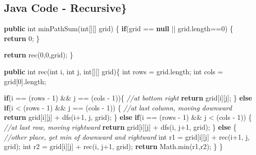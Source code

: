 \documentclass[]{book}
\newenvironment{Shaded}{\begin{snugshade}}{\end{snugshade}}
\newcommand{\BuiltInTok}[1]{#1}
\newcommand{\CommentTok}[1]{\textcolor[rgb]{0.56,0.35,0.01}{\textit{#1}}}
\newcommand{\DataTypeTok}[1]{\textcolor[rgb]{0.13,0.29,0.53}{#1}}
\newcommand{\DecValTok}[1]{\textcolor[rgb]{0.00,0.00,0.81}{#1}}
\newcommand{\FunctionTok}[1]{\textcolor[rgb]{0.00,0.00,0.00}{#1}}
\newcommand{\KeywordTok}[1]{\textcolor[rgb]{0.13,0.29,0.53}{\textbf{#1}}}
\newcommand{\NormalTok}[1]{#1}
\begin{document}
\hypertarget{java-code---recursive}{%
\subsection{Java Code - Recursive\}}\label{java-code---recursive}}

\begin{Shaded}
\begin{Highlighting}[]
\KeywordTok{public} \DataTypeTok{int} \FunctionTok{minPathSum}\NormalTok{(}\DataTypeTok{int}\NormalTok{[][] grid) \{}
    \KeywordTok{if}\NormalTok{(grid == }\KeywordTok{null}\NormalTok{ || grid.}\FunctionTok{length}\NormalTok{==}\DecValTok{0}\NormalTok{) \{}
        \KeywordTok{return} \DecValTok{0}\NormalTok{;}
\NormalTok{    \}}

    \KeywordTok{return} \FunctionTok{rec}\NormalTok{(}\DecValTok{0}\NormalTok{,}\DecValTok{0}\NormalTok{,grid);}
\NormalTok{\}}

\KeywordTok{public} \DataTypeTok{int} \FunctionTok{rec}\NormalTok{(}\DataTypeTok{int}\NormalTok{ i, }\DataTypeTok{int}\NormalTok{ j, }\DataTypeTok{int}\NormalTok{[][] grid)\{}
    \DataTypeTok{int}\NormalTok{ rows = grid.}\FunctionTok{length}\NormalTok{;}
    \DataTypeTok{int}\NormalTok{ cols = grid[}\DecValTok{0}\NormalTok{].}\FunctionTok{length}\NormalTok{;}


    \KeywordTok{if}\NormalTok{(i == (rows - }\DecValTok{1}\NormalTok{) && j == (cols - }\DecValTok{1}\NormalTok{))\{}
        \CommentTok{//at bottom right}
        \KeywordTok{return}\NormalTok{ grid[i][j];}
\NormalTok{    \} }\KeywordTok{else} \KeywordTok{if}\NormalTok{(i < (rows - }\DecValTok{1}\NormalTok{) && j == (cols - }\DecValTok{1}\NormalTok{)) \{}
        \CommentTok{//at last column, moving downward}
        \KeywordTok{return}\NormalTok{ grid[i][j] + }\FunctionTok{dfs}\NormalTok{(i+}\DecValTok{1}\NormalTok{, j, grid);}
\NormalTok{    \} }\KeywordTok{else} \KeywordTok{if}\NormalTok{(i == (rows - }\DecValTok{1}\NormalTok{) && j < (cols - }\DecValTok{1}\NormalTok{)) \{}
        \CommentTok{//at last row, moving rightward}
        \KeywordTok{return}\NormalTok{ grid[i][j] + }\FunctionTok{dfs}\NormalTok{(i, j+}\DecValTok{1}\NormalTok{, grid);}
\NormalTok{    \} }\KeywordTok{else}\NormalTok{ \{}
        \CommentTok{//other place, get min of downward and rightward}
        \DataTypeTok{int}\NormalTok{ r1 = grid[i][j] + }\FunctionTok{rec}\NormalTok{(i+}\DecValTok{1}\NormalTok{, j, grid);}
        \DataTypeTok{int}\NormalTok{ r2 = grid[i][j] + }\FunctionTok{rec}\NormalTok{(i, j+}\DecValTok{1}\NormalTok{, grid);}
        \KeywordTok{return} \BuiltInTok{Math}\NormalTok{.}\FunctionTok{min}\NormalTok{(r1,r2);}
\NormalTok{    \}}
\NormalTok{\}}
\end{Highlighting}
\end{Shaded}
\end{document}
